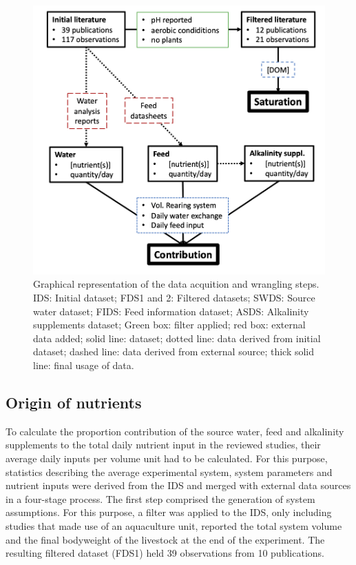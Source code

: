 \documentclass[
]{article}
\begin{document}
\begin{figure}
\centering
\includegraphics{images/data_analysis_flow.png}
\caption{Graphical representation of the data acquition and wrangling steps. IDS: Initial dataset; FDS1 and 2: Filtered datasets; SWDS: Source water dataset; FIDS: Feed information dataset; ASDS: Alkalinity supplements dataset;
Green box: filter applied; red box: external data added; solid line: dataset; dotted line: data derived from initial dataset; dashed line: data derived from external source; thick solid line: final usage of data.}
\end{figure}

\hypertarget{origin-of-nutrients}{%
\subsection{Origin of nutrients}\label{origin-of-nutrients}}

To calculate the proportion contribution of the source water, feed and alkalinity supplements to the total daily nutrient input in the reviewed studies, their average daily inputs per volume unit had to be calculated. For this purpose, statistics describing the average experimental system, system parameters and nutrient inputs were derived from the IDS and merged with external data sources in a four-stage process.
The first step comprised the generation of system assumptions. For this purpose, a filter was applied to the IDS, only including studies that made use of an aquaculture unit, reported the total system volume and the final bodyweight of the livestock at the end of the experiment. The resulting filtered dataset (FDS1) held 39 observations from 10 publications.
\end{document}
